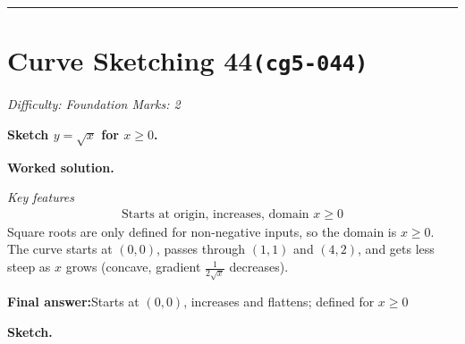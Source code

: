 \documentclass[11pt]{article}
\newcommand{\question}[1]{\par\medskip\noindent\textbf{#1}\par}
\begin{document}
\medskip\hrule

\section*{Curve Sketching 44\quad\small\texttt{(cg5-044)}}
\textit{Difficulty: Foundation \quad\textbar\quad Marks: 2}

\question{Sketch \( y = \sqrt{x} \) for \( x \geq 0 \).}

\textbf{Worked solution.}

\textit{Key features}
\[\begin{gathered}
\text{Starts at origin, increases, domain } x \geq 0
\end{gathered}\]
Square roots are only defined for non-negative inputs, so the domain is \( x \geq 0 \). The curve starts at \( (0,0) \), passes through \( (1,1) \) and \( (4,2) \), and gets less steep as \( x \) grows (concave, gradient \( \tfrac{1}{2\sqrt{x}} \) decreases).

\begin{answerbox}
\textbf{Final answer:}\quad Starts at \(\displaystyle (0,0)\), increases and flattens; defined for \(\displaystyle x \geq 0\)
\end{answerbox}
\textbf{Sketch.}
\end{document}
